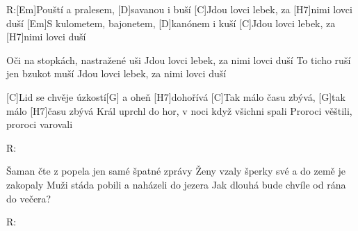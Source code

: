 
R:[Em]Pouští a pralesem, [D]savanou i buší
[C]Jdou lovci lebek, za [H7]nimi lovci duší
[Em]S kulometem, bajonetem, [D]kanónem i kuší
[C]Jdou lovci lebek, za [H7]nimi lovci duší

Oči na stopkách, nastražené uši
Jdou lovci lebek, za nimi lovci duší
To ticho ruší jen bzukot muší
Jdou lovci lebek, za nimi lovci duší

[C]Lid se chvěje úzkostí[G] a oheň [H7]dohořívá
[C]Tak málo času zbývá, [G]tak málo [H7]\null času zbývá
Král uprchl do hor, v noci když všichni spali
Proroci věštili, proroci varovali

R:

Šaman čte z popela jen samé špatné zprávy
Ženy vzaly šperky své a do země je zakopaly
Muži stáda pobili a naházeli do jezera
Jak dlouhá bude chvíle od rána do večera?

R:


